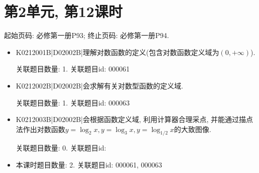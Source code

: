 \section*{第2单元, 第12课时}
起始页码: 必修第一册P93; 终止页码: 必修第一册P94.
\begin{itemize}
\item K0212001B|D02002B|理解对数函数的定义(包含对数函数定义域为$(0,+\infty)$).

关联题目数量: 1. 关联题目id: 000061

\item K0212002B|D02002B|会求解有关对数型函数的定义域.

关联题目数量: 1. 关联题目id: 000063

\item K0212003B|D02002B|会根据函数定义域, 利用计算器合理采点, 并能通过描点法作出对数函数$y=\log_2x,y=\log_3x,y=\log_{1/2}x$的大致图像.

关联题目数量: 0. 关联题目id: 

\item 本课时题目数量: 2. 关联题目id: 000061, 000063

\end{itemize}

